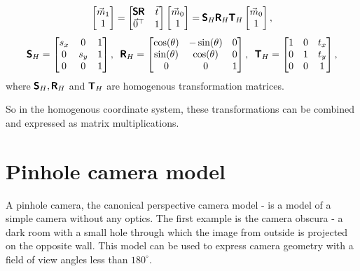 \begin{equation}
    \begin{bmatrix} \vec{m}_1 \\ 1 \end{bmatrix} = 
    \begin{bmatrix}
        \pmb{\mathsf{S}} \pmb{\mathsf{R}} & \vec{t} \\
        \vec{0}^\top & 1
    \end{bmatrix}
    \begin{bmatrix} \vec{m}_0 \\ 1 \end{bmatrix} = 
    \pmb{\mathsf{S}}_H \pmb{\mathsf{R}}_H \pmb{\mathsf{T}}_H
    \begin{bmatrix} \vec{m}_0 \\ 1 \end{bmatrix},
\end{equation}
\begin{equation}
    \pmb{\mathsf{S}}_H = \begin{bmatrix} s_x & 0 & 1\\ 0 & s_y & 1 \\ 0 & 0 & 1\end{bmatrix}, \;\;
    \pmb{\mathsf{R}}_H = \begin{bmatrix} \cos(\theta) & -\sin(\theta) & 0 \\ \sin(\theta) & \cos(\theta) & 0 \\ 0 & 0 & 1 \end{bmatrix}, \;\;
    \pmb{\mathsf{T}}_H = \begin{bmatrix} 1 & 0 & t_x\\ 0 & 1 & t_y \\ 0 & 0 & 1 \end{bmatrix} ,
\end{equation}
where $\pmb{\mathsf{S}}_H, \pmb{\mathsf{R}}_H$ and $\pmb{\mathsf{T}}_H$ are homogenous transformation matrices.

So in the homogenous coordinate system, these transformations can be combined and expressed as matrix multiplications.

\section{Pinhole camera model}
\label{sec:pinhole_camera_model}
A pinhole camera, the canonical perspective camera model - is a model of a simple camera without any optics.
The first example is the camera obscura - a dark room with a small hole through which the image from outside is projected on the opposite wall. 
This model can be used to express camera geometry with a field of view angles less than $180^{\circ}$.

